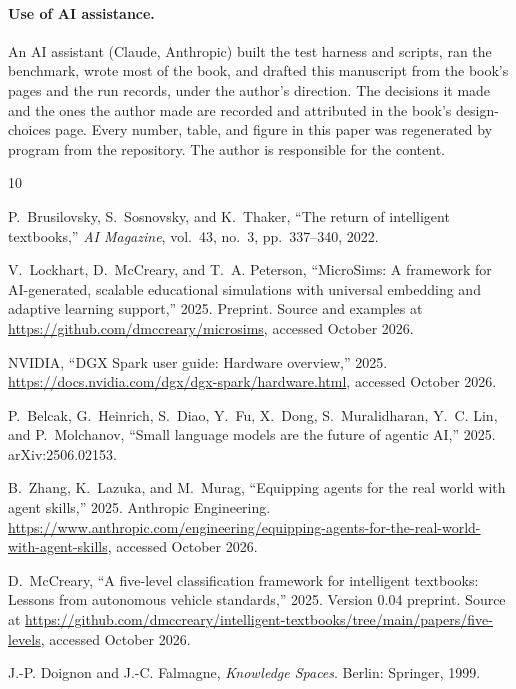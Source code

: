 \documentclass[11pt]{article}
\begin{document}
\paragraph{Use of AI assistance.}
An AI assistant (Claude, Anthropic) built the test harness and scripts, ran the benchmark, wrote most of the book, and drafted this manuscript from the book's pages and the run records, under the author's direction. The decisions it made and the ones the author made are recorded and attributed in the book's design-choices page. Every number, table, and figure in this paper was regenerated by program from the repository. The author is responsible for the content.


\begin{thebibliography}{10}

P.~Brusilovsky, S.~Sosnovsky, and K.~Thaker, ``The return of intelligent
  textbooks,'' {\em AI Magazine}, vol.~43, no.~3, pp.~337--340, 2022.

V.~Lockhart, D.~McCreary, and T.~A. Peterson, ``{MicroSims}: A framework for
  {AI}-generated, scalable educational simulations with universal embedding and
  adaptive learning support,'' 2025.
\newblock Preprint. Source and examples at
  \url{https://github.com/dmccreary/microsims}, accessed October 2026.

{NVIDIA}, ``{DGX Spark} user guide: Hardware overview,'' 2025.
\newblock \url{https://docs.nvidia.com/dgx/dgx-spark/hardware.html}, accessed
  October 2026.

P.~Belcak, G.~Heinrich, S.~Diao, Y.~Fu, X.~Dong, S.~Muralidharan, Y.~C. Lin,
  and P.~Molchanov, ``Small language models are the future of agentic {AI},''
  2025.
\newblock arXiv:2506.02153.

B.~Zhang, K.~Lazuka, and M.~Murag, ``Equipping agents for the real world with
  agent skills,'' 2025.
\newblock Anthropic Engineering.
  \url{https://www.anthropic.com/engineering/equipping-agents-for-the-real-world-with-agent-skills},
  accessed October 2026.

D.~McCreary, ``A five-level classification framework for intelligent textbooks:
  Lessons from autonomous vehicle standards,'' 2025.
\newblock Version 0.04 preprint. Source at
  \url{https://github.com/dmccreary/intelligent-textbooks/tree/main/papers/five-levels},
  accessed October 2026.

J.-P. Doignon and J.-C. Falmagne, {\em Knowledge Spaces}.
\newblock Berlin: Springer, 1999.


\end{thebibliography}
\end{document}
